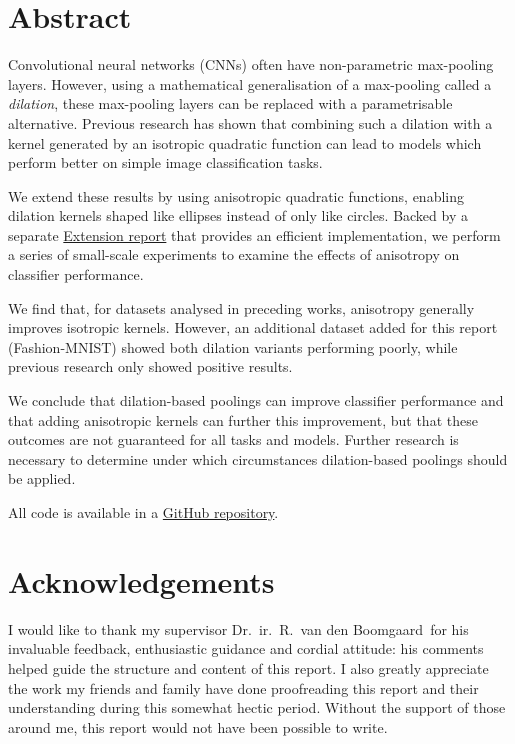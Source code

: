 \documentclass[a4paper, 12pt]{report}
\newcommand{\theSupervisor}{Dr.\ ir.\ R.\ van den Boomgaard} %
\begin{document}
\setcounter{page}{1}
\pagestyle{plain} 

\section*{Abstract}
Convolutional neural networks (CNNs) often have non-parametric max-pooling layers. However, using a mathematical generalisation of a max-pooling called a \textit{dilation}, these max-pooling layers can be replaced with a parametrisable alternative. Previous research has shown that combining such a dilation with a kernel generated by an isotropic quadratic function can lead to models which perform better on simple image classification tasks. 

We extend these results by using anisotropic quadratic functions, enabling dilation kernels shaped like ellipses instead of only like circles. Backed by a separate \href{https://github.com/p-adema/quadratic-conv/blob/main/report/extension.pdf}{\color{cyan}Extension report} that provides an efficient implementation, we perform a series of small-scale experiments to examine the effects of anisotropy on classifier performance. 

We find that, for datasets analysed in preceding works, anisotropy generally improves isotropic kernels. However, an additional dataset added for this report (Fashion-MNIST) showed both dilation variants performing poorly, while previous research only showed positive results. 

We conclude that dilation-based poolings can improve classifier performance and that adding anisotropic kernels can further this improvement, but that these outcomes are not guaranteed for all tasks and models. Further research is necessary to determine under which circumstances dilation-based poolings should be applied.

All code is available in a \href{https://github.com/p-adema/quadratic-conv}{\color{cyan}GitHub repository}.

\vfill
\section*{Acknowledgements}
I would like to thank my supervisor \theSupervisor\ for his invaluable feedback, enthusiastic guidance and cordial attitude: his comments helped guide the structure and content of this report. I also greatly appreciate the work my friends and family have done proofreading this report and their understanding during this somewhat hectic period. Without the support of those around me, this report would not have been possible to write.
\end{document}
